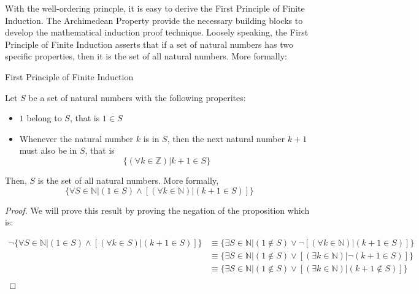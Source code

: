 With the well-ordering princple, it is easy to derive the First Principle of Finite Induction. The Archimedean Property provide the necessary building blocks to develop the mathematical induction proof technique. Loosely speaking, the First Principle of Finite Induction asserts that if a set of natural numbers has two specific properties, then it is the set of all natural numbers. More formally: 

\begin{definition}
First Principle of Finite Induction \\

\begin{tcolorbox}
    \begin{theorem}
        Let $S$ be a set of natural numbers with the following properites: 
            \begin{itemize}
                \item $1$ belong to $S$, that is  $1 \in S$
                \item Whenever the natural number $k$ is in $S$, then the next natural number $k+1$ must also be in $S$, that is
                    \begin{equation*}
                        \{ (\forall k \in \mathbb{Z}) | k+1 \in S \}
                    \end{equation*}
            \end{itemize}
        Then, $S$ is the set of all natural numbers. More formally,
            \begin{equation*}
                \{\forall S \in \mathbb{N}|(1 \in S)\wedge [(\forall k \in \mathbb{N}) | (k+1 \in S)] \}
            \end{equation*}
    \end{theorem}
\end{tcolorbox}

\begin{proof}
    We will prove this result by proving the negation of the proposition which is: 
    
        \begin{align*}
            \neg \{\forall S \in \mathbb{N}|(1 \in S)\wedge [(\forall k \in S) | (k+1 \in S)] \} & \equiv \{\exists S \in \mathbb{N}| (1 \notin S)\vee \neg [(\forall k \in \mathbb{N}) | (k+1 \in S)] \} \nonumber\\
                   & \equiv \{\exists S \in \mathbb{N}| (1 \notin S)\vee [(\exists k \in \mathbb{N}) | \neg (k+1 \in S)] \} \nonumber\\
                   & \equiv \{\exists S \in \mathbb{N}| (1 \notin S)\vee [(\exists k \in \mathbb{N}) | (k+1 \notin S)] \} \nonumber\\
        \end{align*}
        

\end{proof}
\end{definition}
